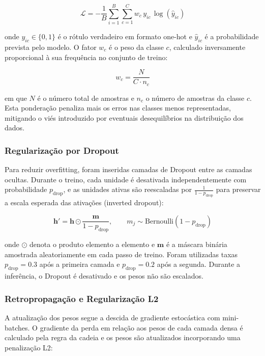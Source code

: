 \documentclass[a4paper,12pt]{scrreprt}
\begin{document}
            \[
            \mathcal{L} = -\frac{1}{B}\sum_{i=1}^{B}\sum_{c=1}^{C} w_c\, y_{ic}\, \log\!\left(\hat{y}_{ic}\right)
            \]

            onde $y_{ic} \in \{0,1\}$ é o rótulo verdadeiro em formato one-hot e $\hat{y}_{ic}$ é a probabilidade prevista pelo modelo. O fator $w_c$ é o peso da classe $c$, calculado inversamente proporcional à sua frequência no conjunto de treino:

            \[
            w_c = \frac{N}{C \cdot n_c}
            \]

            em que $N$ é o número total de amostras e $n_c$ o número de amostras da classe $c$. Esta ponderação penaliza mais os erros nas classes menos representadas, mitigando o viés introduzido por eventuais desequilíbrios na distribuição dos dados.

            \subsubsection*{Regularização por Dropout}

            Para reduzir overfitting, foram inseridas camadas de Dropout entre as camadas ocultas. Durante o treino, cada unidade é desativada independentemente com probabilidade $p_{\mathrm{drop}}$, e as unidades ativas são reescaladas por $\frac{1}{1 - p_{\mathrm{drop}}}$ para preservar a escala esperada das ativações (inverted dropout):

            \[
            \mathbf{h}' = \mathbf{h} \odot \frac{\mathbf{m}}{1 - p_{\mathrm{drop}}}, \qquad m_j \sim \mathrm{Bernoulli}(1 - p_{\mathrm{drop}})
            \]

            onde $\odot$ denota o produto elemento a elemento e $\mathbf{m}$ é a máscara binária amostrada aleatoriamente em cada passo de treino. Foram utilizadas taxas $p_{\mathrm{drop}} = 0.3$ após a primeira camada e $p_{\mathrm{drop}} = 0.2$ após a segunda. Durante a inferência, o Dropout é desativado e os pesos não são escalados.

            \subsubsection*{Retropropagação e Regularização L2}

            A atualização dos pesos segue a descida de gradiente estocástica com mini-batches. O gradiente da perda em relação aos pesos de cada camada densa é calculado pela regra da cadeia e os pesos são atualizados incorporando uma penalização L2:
\end{document}
